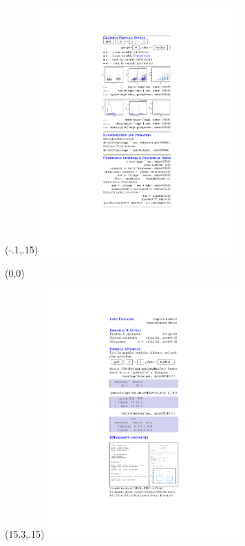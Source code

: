 \documentclass{article}
\begin{document}
{%

\begin{textblock}{3}(-.1,.15)
\includegraphics[width=2.9in]{backflap.pdf}
\end{textblock}

\begin{textblock}{3}(0,0)
\noindent{}
\end{textblock}


\begin{textblock}{3}(15.3,.15)
\includegraphics[width=2.9in]{frontflap.pdf}
\end{textblock}

}
\end{document}
